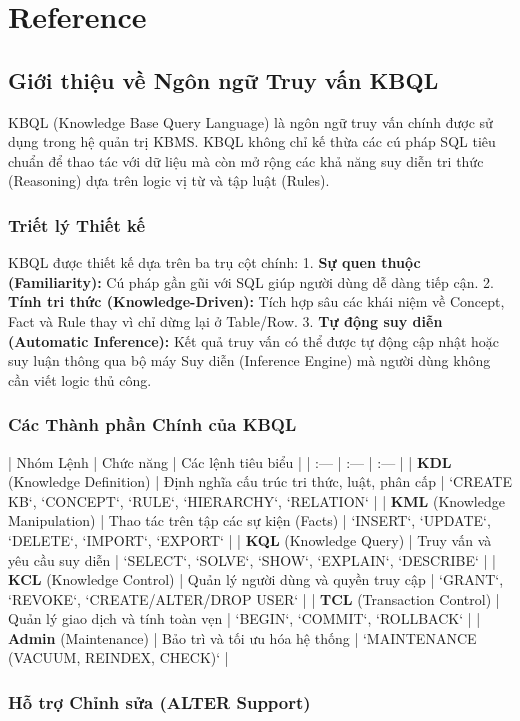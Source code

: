 \chapter{Reference}
\section{Giới thiệu về Ngôn ngữ Truy vấn KBQL}

KBQL (Knowledge Base Query Language) là ngôn ngữ truy vấn chính được sử dụng trong hệ quản trị KBMS. KBQL không chỉ kế thừa các cú pháp SQL tiêu chuẩn để thao tác với dữ liệu mà còn mở rộng các khả năng suy diễn tri thức (Reasoning) dựa trên logic vị từ và tập luật (Rules).

\subsection{Triết lý Thiết kế}

KBQL được thiết kế dựa trên ba trụ cột chính:
1.  \textbf{Sự quen thuộc (Familiarity):} Cú pháp gần gũi với SQL giúp người dùng dễ dàng tiếp cận.
2.  \textbf{Tính tri thức (Knowledge-Driven):} Tích hợp sâu các khái niệm về Concept, Fact và Rule thay vì chỉ dừng lại ở Table/Row.
3.  \textbf{Tự động suy diễn (Automatic Inference):} Kết quả truy vấn có thể được tự động cập nhật hoặc suy luận thông qua bộ máy Suy diễn (Inference Engine) mà người dùng không cần viết logic thủ công.

\subsection{Các Thành phần Chính của KBQL}

| Nhóm Lệnh | Chức năng | Các lệnh tiêu biểu |
| :--- | :--- | :--- |
| \textbf{KDL} (Knowledge Definition) | Định nghĩa cấu trúc tri thức, luật, phân cấp | `CREATE KB`, `CONCEPT`, `RULE`, `HIERARCHY`, `RELATION` |
| \textbf{KML} (Knowledge Manipulation) | Thao tác trên tập các sự kiện (Facts) | `INSERT`, `UPDATE`, `DELETE`, `IMPORT`, `EXPORT` |
| \textbf{KQL} (Knowledge Query) | Truy vấn và yêu cầu suy diễn | `SELECT`, `SOLVE`, `SHOW`, `EXPLAIN`, `DESCRIBE` |
| \textbf{KCL} (Knowledge Control) | Quản lý người dùng và quyền truy cập | `GRANT`, `REVOKE`, `CREATE/ALTER/DROP USER` |
| \textbf{TCL} (Transaction Control) | Quản lý giao dịch và tính toàn vẹn | `BEGIN`, `COMMIT`, `ROLLBACK` |
| \textbf{Admin} (Maintenance) | Bảo trì và tối ưu hóa hệ thống | `MAINTENANCE (VACUUM, REINDEX, CHECK)` |

\subsection{Hỗ trợ Chỉnh sửa (ALTER Support)}

